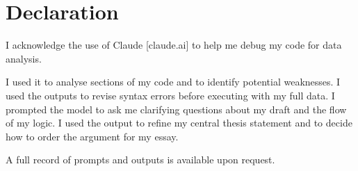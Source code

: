 
\chapter*{Declaration}

I acknowledge the use of Claude [claude.ai] to help me debug my code for data analysis.

I used it to analyse sections of my code and to identify potential weaknesses. I used the outputs to revise syntax errors before executing with my full data. I prompted the model to ask me clarifying questions about my draft and the flow of my logic. I used the output to refine my central thesis statement and to decide how to order the argument for my essay.

A full record of prompts and outputs is available upon request.
